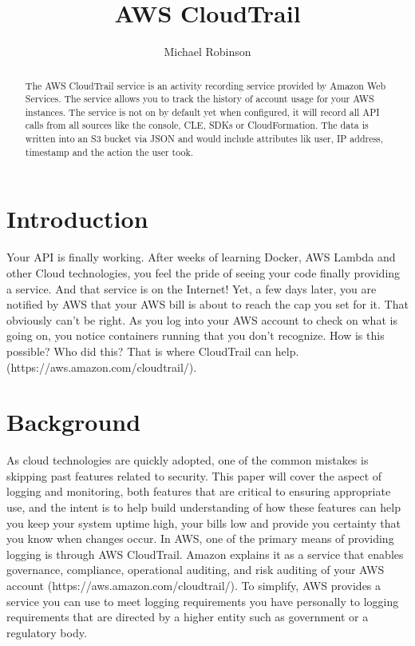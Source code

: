 \title{AWS CloudTrail}

\author{Michael Robinson}


\renewcommand{\shortauthors}{M. Robinson}


\begin{abstract}
The AWS CloudTrail service is an activity recording service provided by 
Amazon Web Services. The service allows you to track the history of account 
usage for your AWS instances. The service is not on by default yet when 
configured, it will record all API calls from all sources like the console, 
CLE, SDKs or CloudFormation. The data is written into an S3 bucket via JSON 
and would include attributes lik user, IP address, timestamp and the action 
the user took.
\end{abstract}



\maketitle

\section{Introduction}

Your API is finally working. After weeks of learning Docker, AWS Lambda and other Cloud technologies, you feel the pride of seeing your code finally providing a service. And that service is on the Internet! Yet, a few days later, you are notified by AWS that your AWS bill is about to reach the cap you set for it. That obviously can’t be right. As you log into your AWS account to check on what is going on, you notice containers running that you don’t recognize. How is this possible? Who did this? That is where CloudTrail can help. (https://aws.amazon.com/cloudtrail/).

\section{Background}

As cloud technologies are quickly adopted, one of the common mistakes is skipping past features related to security. This paper will cover the aspect of logging and monitoring, both features that are critical to ensuring appropriate use, and the intent is to help build understanding of how these features can help you keep your system uptime high, your bills low and provide you certainty that you know when changes occur.
In AWS, one of the primary means of providing logging is through AWS CloudTrail. Amazon explains it as a service that enables governance, compliance, operational auditing, and risk auditing of your AWS account (https://aws.amazon.com/cloudtrail/). To simplify, AWS provides a service you can use to meet logging requirements you have personally to logging requirements that are directed by a higher entity such as government or a regulatory body.

